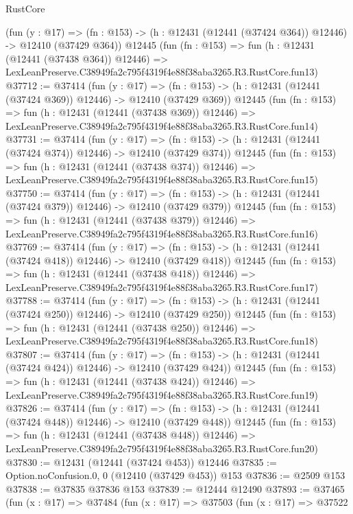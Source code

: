 \begin{lexlean}{RustCore}
\begin{coremodule}
    (fun (y : @17) =>
    (fn : @153) -> (h : @12431 (@12441 (@37424 @364)) @12446) -> @12410 (@37429 @364))
    @12445
    (fun (fn : @153) =>
    fun (h : @12431 (@12441 (@37438 @364)) @12446) =>
    LexLeanPreserve.C38949fa2c795f4319f4e88f38aba3265.R3.RustCore.fun13)
@37712 := @37414
    (fun (y : @17) =>
    (fn : @153) -> (h : @12431 (@12441 (@37424 @369)) @12446) -> @12410 (@37429 @369))
    @12445
    (fun (fn : @153) =>
    fun (h : @12431 (@12441 (@37438 @369)) @12446) =>
    LexLeanPreserve.C38949fa2c795f4319f4e88f38aba3265.R3.RustCore.fun14)
@37731 := @37414
    (fun (y : @17) =>
    (fn : @153) -> (h : @12431 (@12441 (@37424 @374)) @12446) -> @12410 (@37429 @374))
    @12445
    (fun (fn : @153) =>
    fun (h : @12431 (@12441 (@37438 @374)) @12446) =>
    LexLeanPreserve.C38949fa2c795f4319f4e88f38aba3265.R3.RustCore.fun15)
@37750 := @37414
    (fun (y : @17) =>
    (fn : @153) -> (h : @12431 (@12441 (@37424 @379)) @12446) -> @12410 (@37429 @379))
    @12445
    (fun (fn : @153) =>
    fun (h : @12431 (@12441 (@37438 @379)) @12446) =>
    LexLeanPreserve.C38949fa2c795f4319f4e88f38aba3265.R3.RustCore.fun16)
@37769 := @37414
    (fun (y : @17) =>
    (fn : @153) -> (h : @12431 (@12441 (@37424 @418)) @12446) -> @12410 (@37429 @418))
    @12445
    (fun (fn : @153) =>
    fun (h : @12431 (@12441 (@37438 @418)) @12446) =>
    LexLeanPreserve.C38949fa2c795f4319f4e88f38aba3265.R3.RustCore.fun17)
@37788 := @37414
    (fun (y : @17) =>
    (fn : @153) -> (h : @12431 (@12441 (@37424 @250)) @12446) -> @12410 (@37429 @250))
    @12445
    (fun (fn : @153) =>
    fun (h : @12431 (@12441 (@37438 @250)) @12446) =>
    LexLeanPreserve.C38949fa2c795f4319f4e88f38aba3265.R3.RustCore.fun18)
@37807 := @37414
    (fun (y : @17) =>
    (fn : @153) -> (h : @12431 (@12441 (@37424 @424)) @12446) -> @12410 (@37429 @424))
    @12445
    (fun (fn : @153) =>
    fun (h : @12431 (@12441 (@37438 @424)) @12446) =>
    LexLeanPreserve.C38949fa2c795f4319f4e88f38aba3265.R3.RustCore.fun19)
@37826 := @37414
    (fun (y : @17) =>
    (fn : @153) -> (h : @12431 (@12441 (@37424 @448)) @12446) -> @12410 (@37429 @448))
    @12445
    (fun (fn : @153) =>
    fun (h : @12431 (@12441 (@37438 @448)) @12446) =>
    LexLeanPreserve.C38949fa2c795f4319f4e88f38aba3265.R3.RustCore.fun20)
@37830 := @12431 (@12441 (@37424 @453)) @12446
@37835 := Option.noConfusion.{0, 0} (@12410 (@37429 @453)) @153
@37836 := @2509 @153
@37838 := @37835 @37836 @153
@37839 := @12444 @12490
@37893 := @37465
    (fun (x : @17) =>
    @37484
      (fun (x : @17) =>
      @37503
        (fun (x : @17) =>
        @37522

\end{coremodule}
\end{lexlean}
